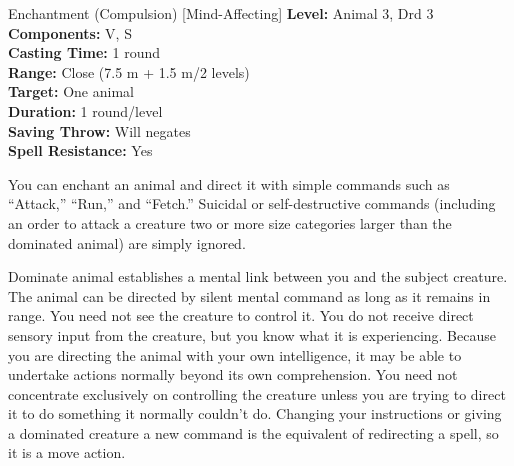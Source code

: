 {Enchantment (Compulsion) [Mind-Affecting]}
{
	\textbf{Level:}
	Animal 3, Drd 3\\
	\textbf{Components:}
	V, S\\
	\textbf{Casting Time:}
	1 round\\
	\textbf{Range:}
	Close (7.5 m + 1.5 m/2 levels)\\
	\textbf{Target:}
	One animal\\
	\textbf{Duration:}
	1 round/level\\
	\textbf{Saving Throw:}
	Will negates\\
	\textbf{Spell Resistance:}
	Yes\\
}
{
	You can enchant an animal and direct it with simple commands such as ``Attack,'' ``Run,'' and ``Fetch.'' Suicidal or self-destructive commands (including an order to attack a creature two or more size categories larger than the dominated animal) are simply ignored.

	Dominate animal establishes a mental link between you and the subject creature. The animal can be directed by silent mental command as long as it remains in range. You need not see the creature to control it. You do not receive direct sensory input from the creature, but you know what it is experiencing. Because you are directing the animal with your own intelligence, it may be able to undertake actions normally beyond its own comprehension. You need not concentrate exclusively on controlling the creature unless you are trying to direct it to do something it normally couldn't do. Changing your instructions or giving a dominated creature a new command is the equivalent of redirecting a spell, so it is a move action.

}
